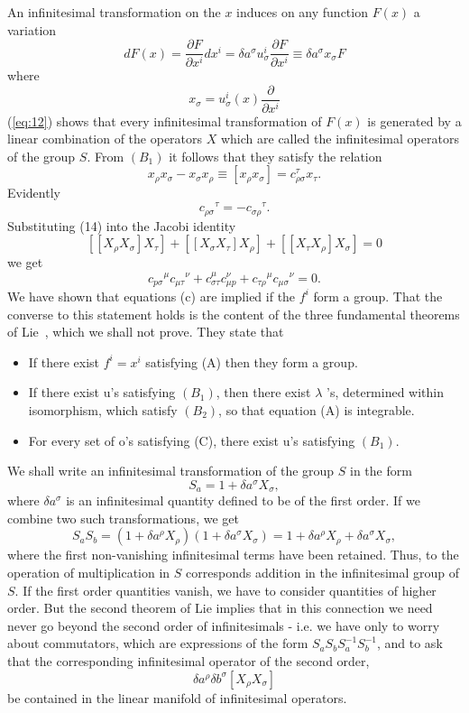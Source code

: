 An infinitesimal transformation on the \(x\) induces on any function \(F(x)\) a variation
\begin{equation}\label{eq:12}
d F(x)=\frac{\partial F}{\partial x^i} d x^i=
\delta a^\sigma u_\sigma^i \frac{\partial F}{\partial x^i} \equiv \delta a^\sigma x_\sigma F
\end{equation}
where
\begin{equation}\label{eq:13}
x_\sigma=u_\sigma^i(x) \frac{\partial}{\partial x^i}
\end{equation}
(\ref{eq:12}) shows that every infinitesimal transformation of \(F(x)\) is generated by
a linear combination of the operators \(X\) which are called the infinitesimal
operators of the group \(S\). From \(\left(B_1\right)\) it follows that they
satisfy the relation
\begin{equation}\label{eq:14}
x_\rho x_\sigma-x_\sigma x_\rho \equiv\left[x_\rho x_\sigma\right]=c_{\rho \sigma}^\tau x_\tau .
\end{equation}
Evidently
\[
c_{\rho \sigma}{ }^\tau=-c_{\sigma \rho}{ }^\tau .
\tag{C1}
\]
Substituting (14) into the Jacobi identity
\[
\left[\left[X_\rho X_\sigma\right] X_\tau\right]+
\left[\left[X_\sigma X_\tau\right] X_\rho\right]+
\left[\left[X_\tau X_\rho\right] X_\sigma\right]=0
\]
we get
\[
c_{p \sigma}{ }^\mu c_{\mu \tau}{ }^\nu+c_{\sigma \tau}^\mu c_{\mu p}^\nu+c_{\tau \rho}{ }^\mu c_{\mu \sigma}{ }^\nu=0.
\tag{C2}
\]
We have shown that equations (c) are implied if the \(f^i\) form a group. That the converse to this statement holds is the content of the three fundamental theorems of Lie~\cite{Lie1893}, which we shall not prove. They state that
\begin{itemize}
\item[I.] If there exist \(f^i=x^i\) satisfying (A) then they form a group.
\item[II.] If there exist u's satisfying \(\left(B_1\right)\), then there exist \(\lambda\) 's, determined within isomorphism, which satisfy \(\left(B_2\right)\), so that equation (A) is integrable.
\item[III.] For every set of o's satisfying (C), there exist u's satisfying \(\left(B_1\right)\).
\end{itemize}
We shall write an infinitesimal transformation of the group \(S\) in the form
\[
S_a=1+\delta a^\sigma X_\sigma,
\]
where \(\delta a^\sigma\) is an infinitesimal quantity defined to be of
the first order. If we combine two such transformations, we get
\[
S_a S_b= \left(1+\delta a^{\rho} X_\rho\right)\left(1+\delta a^{\sigma} X_{\sigma}\right)=
1+\delta a^{\rho} X_{\rho}+\delta a^{\sigma} X_{\sigma},
\]
where the first non-vanishing infinitesimal terms have been retained.
Thus, to the operation of multiplication in \(S\) corresponds addition in the
infinitesimal group of \(S\). If the first order quantities vanish, we have to
consider quantities of higher order. But the second theorem of Lie implies that
in this connection we need never go beyond the second order of infinitesimals -
i.e. we have only to worry about commutators, which are expressions of the form
\(S_a S_b S_a^{-1} S_b^{-1}\), and to ask that the corresponding infinitesimal
operator of the second order,
\[\delta a^{\rho} \delta b^\sigma\left[X_\rho X_\sigma\right]
\]
be contained in the linear manifold of infinitesimal operators.
